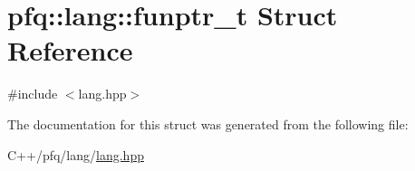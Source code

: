 \hypertarget{structpfq_1_1lang_1_1funptr__t}{\section{pfq\+:\+:lang\+:\+:funptr\+\_\+t Struct Reference}
\label{structpfq_1_1lang_1_1funptr__t}
}


{\ttfamily \#include $<$lang.\+hpp$>$}



The documentation for this struct was generated from the following file\+:\begin{DoxyCompactItemize}
\item 
C++/pfq/lang/\hyperlink{lang_8hpp}{lang.\+hpp}\end{DoxyCompactItemize}
